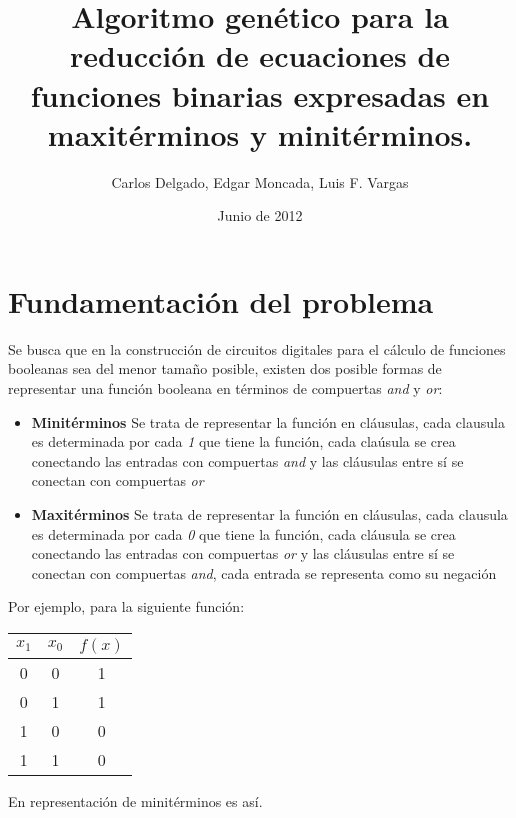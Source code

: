 \documentclass[a4paper]{article}
\title{Algoritmo genético para la reducción de ecuaciones de funciones binarias expresadas en maxitérminos y minitérminos.}
\author{Carlos Delgado, Edgar Moncada, Luis F. Vargas}
\date{Junio de 2012}
\begin{document}
\maketitle{}
\renewcommand{\tablename}{\textbf{Tabla}}


\section{Fundamentación del problema}

Se busca que en la construcción de circuitos digitales para el cálculo de funciones booleanas sea del menor tamaño posible, existen dos posible formas de representar una función booleana en términos de compuertas \textit{and} y \textit{or}:

\begin{itemize}
	\item \textbf{Minitérminos} Se trata de representar la función en cláusulas, cada clausula es determinada por cada \textit{1} que tiene la función, cada claúsula se crea conectando las entradas con compuertas \textit{and} y las cláusulas entre sí se conectan con compuertas \textit{or}
	\item \textbf{Maxitérminos} Se trata de representar la función en cláusulas, cada clausula es determinada por cada \textit{0} que tiene la función, cada cláusula se crea conectando las entradas con compuertas \textit{or} y las cláusulas entre sí se conectan con compuertas \textit{and}, cada entrada se representa como su negación
\end{itemize}

Por ejemplo, para la siguiente función:

\begin{table}[H]
	\centering
	\begin{tabular}{|c | c | c|}
		\hline
		$x_1$ & $x_0$ & $f(x)$ \\
		\hline
		\hline
		0 & 0& 1\\
		\hline
		0 & 1 & 1\\
		\hline
		1 & 0& 0\\
		\hline
		1 & 1 & 0\\
		\hline
	\end{tabular}
\end{table}

En representación de minitérminos es así.
\end{document}
